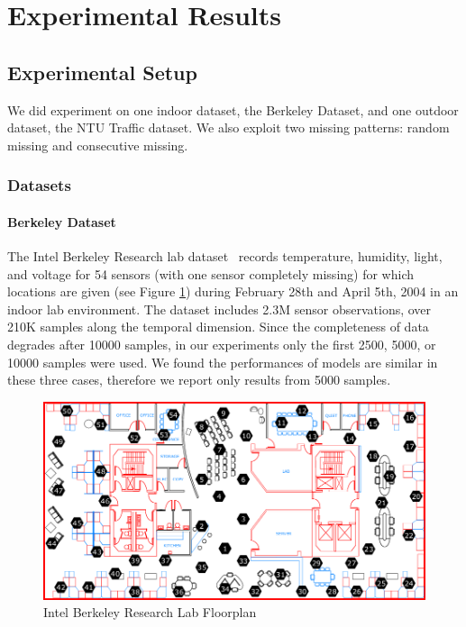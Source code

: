 \section{Experimental Results}  \label{sec:exp}

\subsection{Experimental Setup}
We did experiment on one indoor dataset, the Berkeley Dataset, and one outdoor dataset, the NTU Traffic dataset. We also exploit two missing patterns: random missing and consecutive missing.
\subsubsection{Datasets}

\paragraph*{Berkeley Dataset}

The Intel Berkeley Research lab dataset~\cite{berkeley2004lab} records temperature, humidity, light, and voltage for 54 sensors (with one sensor completely missing) for which locations are given (see Figure \ref{berkeley_lab}) during February 28th and April 5th, 2004 in an indoor lab environment.
The dataset includes 2.3M sensor observations, over 210K samples along the temporal dimension. Since the completeness of data degrades after 10000 samples, in our experiments only the first 2500, 5000, or 10000 samples were used. We found the performances of models are similar in these three cases, therefore we report only results from 5000 samples. 

\begin{figure}[H]
\centering
\includegraphics[scale=0.25]{berkeley_lab.png}
\caption{Intel Berkeley Research Lab Floorplan} \label{berkeley_lab}
\end{figure}

